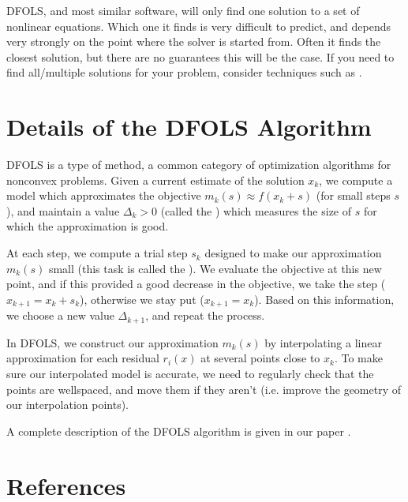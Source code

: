 \documentclass[letterpaper,10pt,english]{sphinxmanual}
\begin{document}
 DFO\sphinxhyphen{}LS, and most similar software, will only find one solution to a set of nonlinear equations. Which one it finds is very difficult to predict, and depends very strongly on the point where the solver is started from. Often it finds the closest solution, but there are no guarantees this will be the case. If you need to find all/multiple solutions for your problem, consider techniques such as .


\section{Details of the DFO\sphinxhyphen{}LS Algorithm}
\label{\detokenize{info:details-of-the-dfo-ls-algorithm}}
DFO\sphinxhyphen{}LS is a type of  method, a common category of optimization algorithms for nonconvex problems. Given a current estimate of the solution \(x_k\), we compute a model which approximates the objective \(m_k(s)\approx f(x_k+s)\) (for small steps \(s\)), and maintain a value \(\Delta_k>0\) (called the ) which measures the size of \(s\) for which the approximation is good.

At each step, we compute a trial step \(s_k\) designed to make our approximation \(m_k(s)\) small (this task is called the ). We evaluate the objective at this new point, and if this provided a good decrease in the objective, we take the step (\(x_{k+1}=x_k+s_k\)), otherwise we stay put (\(x_{k+1}=x_k\)). Based on this information, we choose a new value \(\Delta_{k+1}\), and repeat the process.

In DFO\sphinxhyphen{}LS, we construct our approximation \(m_k(s)\) by interpolating a linear approximation for each residual \(r_i(x)\) at several points close to \(x_k\). To make sure our interpolated model is accurate, we need to regularly check that the points are well\sphinxhyphen{}spaced, and move them if they aren’t (i.e. improve the geometry of our interpolation points).

A complete description of the DFO\sphinxhyphen{}LS algorithm is given in our paper .


\section{References}
\label{\detokenize{info:references}}
\end{document}
